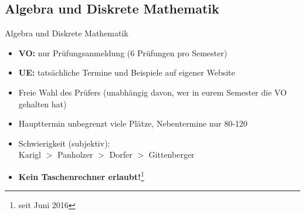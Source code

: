 \documentclass{beamer}
\begin{document}
\subsection{Algebra und Diskrete Mathematik}
\begin{frame}{Algebra und Diskrete Mathematik}
    \begin{itemize}
        \item \textbf{VO:} nur Prüfungsanmeldung (6 Prüfungen pro Semester)
        \item \textbf{UE:} tatsächliche Termine und Beispiele auf eigener Website
        \item Freie Wahl des Prüfers (unabhängig davon, wer in eurem Semester die VO gehalten hat)
        \item Haupttermin unbegrenzt viele Plätze, Nebentermine nur 80-120
        \item Schwierigkeit (subjektiv): \\
            Karigl $>$ Panholzer $>$ Dorfer $>$ Gittenberger
        \item \textbf{Kein Taschenrechner erlaubt!}\footnote{seit Juni 2016}
    \end{itemize}
\end{frame}
\end{document}

